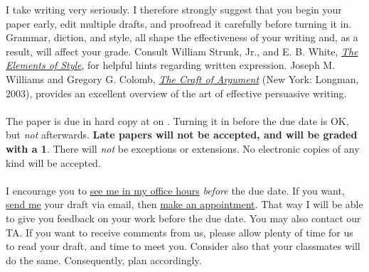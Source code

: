 \documentclass[letterpaper]{article}
\begin{document}
\begin{enumerate}
	I take writing very seriously. I therefore strongly suggest that you begin your paper early, edit multiple drafts, and proofread it carefully before turning it in. Grammar, diction, and style, all shape the effectiveness of your writing and, as a result, will affect your grade. Consult William Strunk, Jr., and E. B. White, \href{http://www.jlakes.org/ch/web/The-elements-of-style.pdf}{\emph{The Elements of Style}}, for helpful hints regarding written expression. Joseph M. Williams and Gregory G. Colomb, \href{http://sir.spbu.ru/en/programs/master/master_program_in_international_relations/digital_library/Book%20Research%20seminar%20by%20Booth.pdf}{\emph{The Craft of Argument}} (New York: Longman, 2003), provides an excellent overview of the art of effective persuasive writing.
	\\ 
	\\
	The paper is due in hard copy at {\unskip} on {\bf {\unskip}}. Turning it in before the due date is OK, but \emph{not} afterwards. {\bf Late papers will not be accepted, and will be graded with a 1}. There will \emph{not} be exceptions or extensions. No electronic copies of any kind will be accepted.
	\\
	\\
	I encourage you to \href{https://calendly.com/bahamonde/officehours}{see me in my office hours} \emph{before} the due date. If you want, \href{mailto:\filetext}{send me} your draft via email, then \href{https://calendly.com/bahamonde/officehours}{make an appointment}. That way I will be able to give you feedback on your work before the due date. You may also contact our TA. If you want to receive comments from us, please allow plenty of time for us to read your draft, and time to meet you. Consider also that your classmates will do the same. Consequently, plan accordingly.


\end{enumerate}
\end{document}
